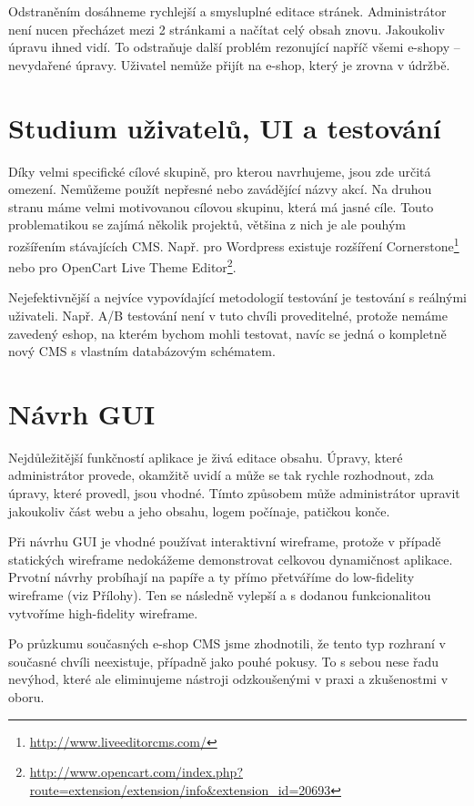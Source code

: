 \documentclass[11pt,a4paper]{article}
\begin{document}
Odstraněním  dosáhneme rychlejší a smysluplné editace stránek. Administrátor není nucen přecházet mezi 2 stránkami a načítat celý obsah znovu. Jakoukoliv úpravu ihned vidí. To odstraňuje další problém rezonující napříč všemi e-shopy -- nevydařené úpravy. Uživatel nemůže přijít na e-shop, který je zrovna v údržbě.


\section*{Studium uživatelů, UI a testování}
Díky velmi specifické cílové skupině, pro kterou navrhujeme, jsou zde určitá omezení. Nemůžeme použít nepřesné nebo zavádějící názvy akcí. Na druhou stranu máme velmi motivovanou cílovou skupinu, která má jasné cíle. Touto problematikou se zajímá několik projektů, většina z nich je ale pouhým rozšířením stávajících CMS. Např. pro Wordpress existuje rozšíření Cornerstone\footnote{\url{http://www.liveeditorcms.com/}} nebo pro OpenCart Live Theme Editor\footnote{\url{http://www.opencart.com/index.php?route=extension/extension/info&extension_id=20693}}.

Nejefektivnější a nejvíce vypovídající metodologií testování je testování s reálnými uživateli. Např. A/B testování není v tuto chvíli proveditelné, protože nemáme zavedený eshop, na kterém bychom mohli testovat, navíc se jedná o kompletně nový CMS s vlastním databázovým schématem.


\section*{Návrh GUI}
Nejdůležitější funkčností aplikace je živá editace obsahu. Úpravy, které administrátor provede, okamžitě uvidí a může se tak rychle rozhodnout, zda úpravy, které provedl, jsou vhodné. Tímto způsobem může administrátor upravit jakoukoliv část webu a jeho obsahu, logem počínaje, patičkou konče.

Při návrhu GUI je vhodné používat interaktivní wireframe, protože v případě statických wireframe nedokážeme demonstrovat celkovou dynamičnost aplikace. Prvotní návrhy probíhají na papíře a ty přímo přetváříme do low-fidelity wireframe (viz Přílohy). Ten se následně vylepší a s dodanou funkcionalitou vytvoříme high-fidelity wireframe.

Po průzkumu současných e-shop CMS jsme zhodnotili, že tento typ rozhraní v současné chvíli neexistuje, případně jako pouhé pokusy. To s sebou nese řadu nevýhod, které ale eliminujeme nástroji odzkoušenými v praxi a zkušenostmi v oboru.
\end{document}
